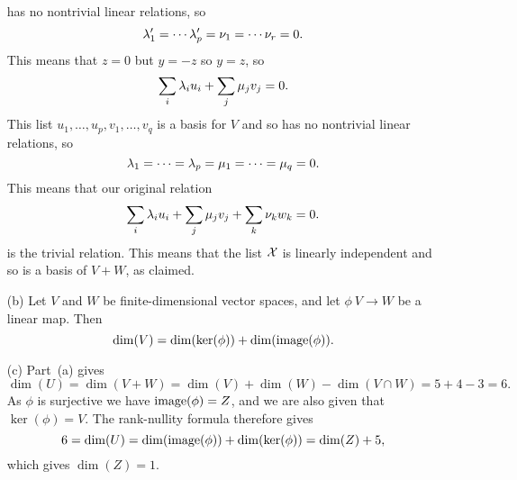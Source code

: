\documentclass[a4paper]{article}
\begin{document}
\begin{solution}
\begin{itemize}
   has no nontrivial linear relations, so 
   \[ \lambda'_1=\dotsb\lambda'_p=\nu_1=\dotsb\nu_r=0. \]
   This means that $z=0$ but $y=-z$ so $y=z$, so 
   \[ \sum_i\lambda_iu_i + \sum_j\mu_jv_j = 0. \]
   This list $u_1,\dotsc,u_p,v_1,\dotsc,v_q$ is a basis for
   $V$ and so has no nontrivial linear relations, so
   \[ \lambda_1=\dotsb=\lambda_p=\mu_1=\dotsb=\mu_q=0. \]
   This means that our original relation
   \[ \sum_i\lambda_iu_i + \sum_j\mu_jv_j + \sum_k\nu_kw_k=0. \]
   is the trivial relation.  This means that the list $\mathcal{X}$
   is linearly independent and so is a basis of $V+W$, as
   claimed. 
  \item[(b)] Let $V$ and $W$ be finite-dimensional vector
   spaces, and let $\phi\:V\to W$ be a linear map.  Then 
   \[ \dim(V) = \dim(\ker(\phi)) + \dim(\operatorname{image}(\phi)).  \] 
  \item[(c)] Part~(a) gives
   \[ \dim(U)=\dim(V+W) = \dim(V)+\dim(W)-\dim(V\cap W) =
       5+4-3 = 6.
   \]
   As $\phi$ is surjective we have $\operatorname{image}(\phi)=Z$, and we
   are also given that $\ker(\phi)=V$.  The
   rank-nullity formula therefore gives
   \[ 6 = \dim(U) = \dim(\operatorname{image}(\phi))+\dim(\ker(\phi)) =
      \dim(Z) + 5,
   \]
   which gives $\dim(Z)=1$.
 \end{itemize}
\end{solution}
\end{document}
